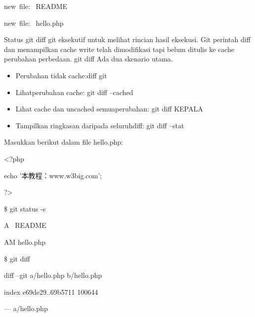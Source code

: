 \noindent 
\vspace{10pt}
\noindent 
{\fontsize{10pt}{10pt}\selectfont  \hspace*{0.64in} new~file:~  README} \par
\noindent 
{\fontsize{10pt}{10pt}\selectfont  \hspace*{0.64in} new~file:~  hello.php} \par
\vspace{12pt}
Status git diff git eksekutif untuk melihat rincian hasil eksekusi. Git perintah diff dan menampilkan cache write telah dimodifikasi tapi belum ditulis ke cache perubahan perbedaan. git diff Ada dua skenario utama.  \par
\noindent 
\begin{itemize}
\item Perubahan tidak cache:diff git  \par
\noindent 
\item Lihatperubahan cache: git diff --cached \par
\noindent 
\item Lihat cache dan uncached semuaperubahan: git diff KEPALA \par
\noindent 
\item Tampilkan ringkasan daripada seluruhdiff: git diff --stat\end{itemize}
 \par
\noindent 
Masukkan berikut dalam file hello.php:  \par
\noindent 
{\fontsize{10pt}{10pt}\selectfont <?php} \par
\noindent 
{\fontsize{10pt}{10pt}\selectfont echo '本教程：www.w3big.com';} \par
\noindent 
{\fontsize{10pt}{10pt}\selectfont ?>} \par
\noindent 
{\fontsize{10pt}{10pt}\selectfont  $  \$  $ git status -s} \par
\noindent 
{\fontsize{10pt}{10pt}\selectfont A~ README} \par
\noindent 
{\fontsize{10pt}{10pt}\selectfont AM hello.php} \par
\noindent 
{\fontsize{10pt}{10pt}\selectfont  $  \$  $ git diff} \par
\noindent 
{\fontsize{10pt}{10pt}\selectfont diff --git a/hello.php b/hello.php} \par
\noindent 
{\fontsize{10pt}{10pt}\selectfont index e69de29..69b5711 100644} \par
\noindent 
{\fontsize{10pt}{10pt}\selectfont --- a/hello.php} \par

